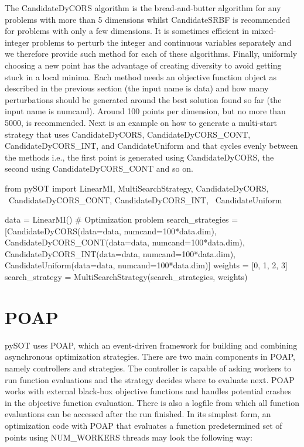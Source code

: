 \documentclass[]{article}
\begin{document}
The CandidateDyCORS algorithm is the bread-and-butter algorithm for any problems with more than 5 dimensions whilst CandidateSRBF is recommended for problems with only a few dimensions. It is sometimes efficient in mixed-integer problems to perturb the integer and continuous variables separately and we therefore provide such method for each of these algorithms. Finally, uniformly choosing a new point has the advantage of creating diversity to avoid getting stuck in a local minima. Each method needs an objective function object as described in the previous section (the input name is data) and how many perturbations should be generated around the best solution found so far (the input name is numcand). Around 100 points per dimension, but no more than 5000, is recommended. Next is an example on how to generate a multi-start strategy that uses CandidateDyCORS, CandidateDyCORS\_CONT, CandidateDyCORS\_INT, and CandidateUniform and that cycles evenly between the methods i.e., the first point is generated using CandidateDyCORS, the second using CandidateDyCORS\_CONT and so on.
\begin{python}
from pySOT import LinearMI, MultiSearchStrategy, CandidateDyCORS, \
			  CandidateDyCORS_CONT, CandidateDyCORS_INT, \
			  CandidateUniform

data = LinearMI()  # Optimization problem
search_strategies = [CandidateDyCORS(data=data, numcand=100*data.dim),
                     CandidateDyCORS_CONT(data=data, numcand=100*data.dim),
                     CandidateDyCORS_INT(data=data, numcand=100*data.dim),
                     CandidateUniform(data=data, numcand=100*data.dim)]
weights = [0, 1, 2, 3]
search_strategy = MultiSearchStrategy(search_strategies, weights)
\end{python}

\section{POAP}
pySOT uses POAP, which an event-driven framework for building and combining asynchronous optimization strategies. There are two main components in POAP, namely controllers and strategies. The controller is  capable of asking workers to run function evaluations and the strategy decides where to evaluate next. POAP works with external black-box objective functions and handles potential crashes in the objective function evaluation. There is also a logfile from which all function evaluations can be accessed after the run finished. In its simplest form, an optimization code with POAP that evaluates a function predetermined set of points using NUM\_WORKERS threads may look the following way:
\end{document}
